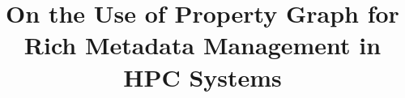 \documentclass[10pt, conference]{IEEEtran}
\begin{document}
\title{On the Use of Property Graph for Rich Metadata Management in HPC Systems}


\maketitle











\end{document}
